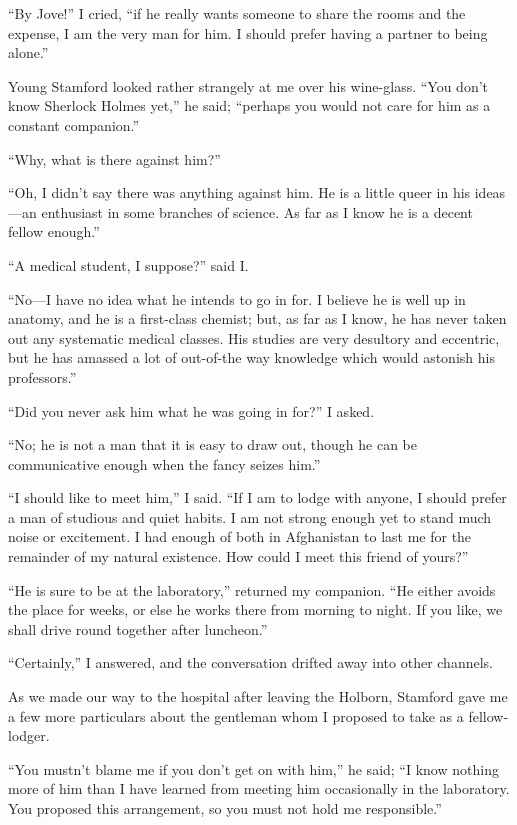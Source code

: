 \documentclass[12pt]{book}
\begin{document}
“By Jove!” I cried, “if he really wants someone to share the rooms and the expense, I am the very man for him. I should prefer having a partner to being alone.” 

Young Stamford looked rather strangely at me over his wine-glass. “You don’t know Sherlock Holmes yet,” he said; “perhaps you would not care for him as a constant companion.” 

“Why, what is there against him?” 

“Oh, I didn’t say there was anything against him. He is a little queer in his ideas—an enthusiast in some branches of science. As far as I know he is a decent fellow enough.” 

“A medical student, I suppose?” said I. 

“No—I have no idea what he intends to go in for. I believe he is well up in anatomy, and he is a first-class chemist; but, as far as I know, he has never taken out any systematic medical classes. His studies are very desultory and eccentric, but he has amassed a lot of out-of-the way knowledge which would astonish his professors.” 

“Did you never ask him what he was going in for?” I asked. 

“No; he is not a man that it is easy to draw out, though he can be communicative enough when the fancy seizes him.” 

“I should like to meet him,” I said. “If I am to lodge with anyone, I should prefer a man of studious and quiet habits. I am not strong enough yet to stand much noise or excitement. I had enough of both in Afghanistan to last me for the remainder of my natural existence. How could I meet this friend of yours?” 

“He is sure to be at the laboratory,” returned my companion. “He either avoids the place for weeks, or else he works there from morning to night. If you like, we shall drive round together after luncheon.” 

“Certainly,” I answered, and the conversation drifted away into other channels. 

As we made our way to the hospital after leaving the Holborn, Stamford gave me a few more particulars about the gentleman whom I proposed to take as a fellow-lodger. 

“You mustn’t blame me if you don’t get on with him,” he said; “I know nothing more of him than I have learned from meeting him occasionally in the laboratory. You proposed this arrangement, so you must not hold me responsible.” 
\end{document}
